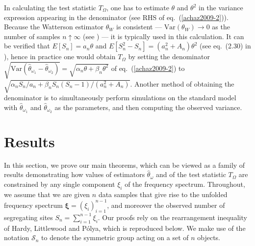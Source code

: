 \documentclass[lettersize, 10pt]{article}
\begin{document}
In calculating the test statistic $T_\Omega$, one has to estimate $\theta$ and $\theta^2$ in the variance expression appearing in the denominator (see RHS of eq.~(\ref{achaz2009-2})). Because the Watterson estimator $\theta_W$ is consistent --- $\text{Var}(\theta_W) \rightarrow 0$ as the number of samples $n\uparrow\infty$ (see \citep[pg.~35]{Durrett2008}) --- it is typically used in this calculation. It can be verified that $E[S_n] = a_n \theta$ and $E[S_n^2-S_n] = (a_n^2 +A_n)\theta^2$ (see eq.~(2.30) in \citep[pg. 66]{Durrett2008}), hence in practice one would obtain $T_\Omega$ by setting the denominator $\sqrt{\text{Var}\left(\hat{\theta}_{\omega_1}-\hat{\theta}_{\omega_2}\right)}=\sqrt{\alpha_n\theta+\beta_n\theta^2}$ of eq.~(\ref{achaz2009-2}) to $\sqrt{\alpha_n S_n/a_n +\beta_n S_n(S_n-1) / (a_n^2+A_n)}$. Another method of obtaining the denominator is to simultaneously perform simulations on the standard model with $\hat{\theta}_{\omega_1}$ and $\hat{\theta}_{\omega_2}$ as the parameters, and then computing the observed variance.

 \section*{Results}

In this section, we prove our main theorems, which can be viewed as a family of results demonstrating how values of estimators $\hat{\theta}_\omega$ and of the test statistic $T_\Omega$ are constrained by any single component $\xi_i$ of the frequency spectrum. Throughout, we assume that we are given $n$ data samples that give rise to the unfolded frequency spectrum $\boldsymbol{\xi}=(\xi_i)_{i=1}^{n-1}$, and moreover the observed number of segregating sites $S_n=\sum_{i=1}^{n-1}\xi_i$. Our proofs rely on the rearrangement inequality of Hardy, Littlewood and P\'olya, which is reproduced below. We make use of the notation $\mathcal{S}_n$ to denote the symmetric group acting on a set of $n$ objects. 
\end{document}
